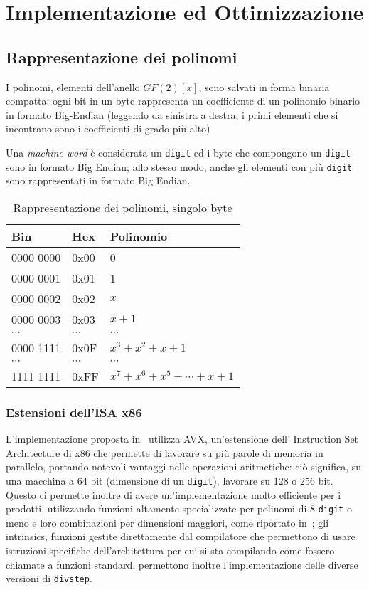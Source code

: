 \section{Implementazione ed Ottimizzazione}\label{impl}
\subsection*{\textbf{Rappresentazione dei polinomi}}
I polinomi, elementi dell'anello $GF(2)[x]$, sono salvati in forma binaria compatta: ogni bit in un byte rappresenta un 
coefficiente di un polinomio binario in formato Big-Endian (leggendo da sinistra a destra, i primi elementi che
si incontrano sono i coefficienti di grado più alto)

Una \textit{machine word} è considerata un \texttt{digit} ed i byte che
compongono un \texttt{digit} sono in formato Big Endian; allo stesso modo, 
anche gli elementi con più \texttt{digit} sono rappresentati in 
formato Big Endian.
\begin{table}
    \caption{Rappresentazione dei polinomi, singolo byte}
    \begin{tabular}{lll}
    \hline
    \textbf{Bin} & \textbf{Hex} & \textbf{Polinomio} \\
    \hline
    0000 0000 & 0x00 & 0 \\
    0000 0001 & 0x01 & 1 \\
    0000 0002 & 0x02 & $x$ \\
    0000 0003 & 0x03 & $x+1$ \\
    $\cdots$ & $\cdots$ & $\cdots$ \\
    0000 1111 & 0x0F & $x^3+x^2+x+1$ \\
    $\cdots$ & $\cdots$ & $\cdots$ \\
    1111 1111 & 0xFF & $x^7+x^6+x^5+\cdots+x+1$ \\
    \hline
    \end{tabular}
\end{table}
\subsubsection*{Estensioni dell'ISA x86}
L'implementazione proposta in~\cite{benchmark} utilizza AVX, un'estensione 
dell' Instruction Set Architecture di x86 che permette di lavorare su più parole di memoria
in parallelo, portando notevoli vantaggi nelle operazioni aritmetiche: ciò significa,
su una macchina a 64 bit (dimensione di un \texttt{digit}), lavorare su 128 o 256 bit.
Questo ci permette inoltre di avere un'implementazione molto efficiente per i prodotti, utilizzando funzioni
altamente specializzate per polinomi di 8 \texttt{digit} o meno e loro combinazioni per dimensioni
maggiori, come riportato in~\cite{bodrato2007towards}; gli intrinsics, funzioni gestite direttamente dal compilatore che permettono di usare
istruzioni specifiche dell'architettura per cui si sta compilando come fossero chiamate a funzioni standard, permettono inoltre 
l'implementazione delle diverse versioni di \texttt{divstep}.



